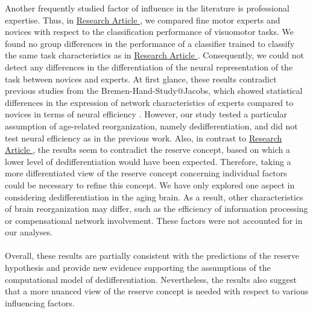 Another frequently studied factor of influence in the literature is professional expertise. Thus, in \hyperref[results:paperIV]{Research Article }, we compared fine motor experts and novices with respect to the classification performance of visuomotor tasks. We found no group differences in the performance of a classifier trained to classify the same task characteristics as in \hyperref[results:paperI]{Research Article }. Consequently, we could not detect any differences in the differentiation of the neural representation of the task between novices and experts. At first glance, these results contradict previous studies from the Bremen-Hand-Study@Jacobs, which showed statistical differences in the expression of network characteristics of experts compared to novices in terms of neural efficiency \cite{Goelz2018, Vieluf2018}. However, our study tested a particular assumption of age-related reorganization, namely dedifferentiation, and did not test neural efficiency as in the previous work. Also, in contrast to \hyperref[results:paperIII]{Research Article }, the results seem to contradict the reserve concept, based on which a lower level of dedifferentiation would have been expected. Therefore, taking a more differentiated view of the reserve concept concerning individual factors could be necessary to refine this concept. We have only explored one aspect in considering dedifferentiation in the aging brain. As a result, other characteristics of brain reorganization may differ, such as the efficiency of information processing or compensational network involvement. These factors were not accounted for in our analyses.\\
\\
Overall, these results are partially consistent with the predictions of the reserve hypothesis and provide new evidence supporting the assumptions of the computational model of dedifferentiation. Nevertheless, the results also suggest that a more nuanced view of the reserve concept is needed with respect to various influencing factors.

